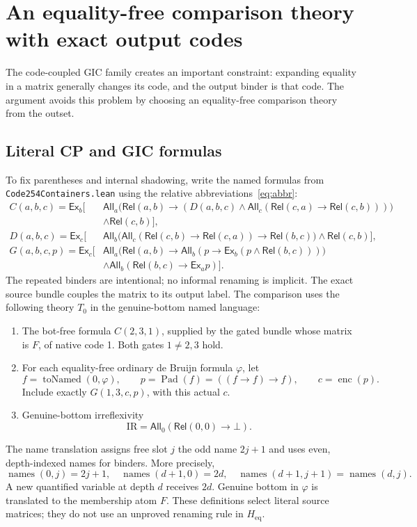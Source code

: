 \documentclass[11pt,letterpaper]{article}
\theoremstyle{definition}\newtheorem{definition}[theorem]{Definition}
\theoremstyle{remark}\newtheorem{remark}[theorem]{Remark}
\newcommand{\Rel}{\mathsf{Rel}}
\newcommand{\All}{\mathsf{All}}
\newcommand{\Ex}{\mathsf{Ex}}
\newcommand{\enc}{\operatorname{enc}}
\newcommand{\pad}{\operatorname{Pad}}
\newcommand{\To}{\rightarrow}
\newcommand{\Hh}{H_{\mathrm{eq}}}
\newcommand{\file}[1]{\begingroup\small\ttfamily\nolinkurl{#1}\endgroup}
\begin{document}
\section{An equality-free comparison theory with exact output codes}\label{sec:theory}
The code-coupled GIC family creates an important constraint: expanding equality in a matrix generally changes its code, and the output binder is that code. The argument avoids this problem by choosing an equality-free comparison theory from the outset.

\subsection{Literal CP and GIC formulas}
To fix parentheses and internal shadowing, write the named formulas from \file{Code254Containers.lean} using the relative abbreviations~\eqref{eq:abbr}:
\begin{align*}
 C(a,b,c)=\Ex_b\bigl[&\All_a\bigl(\Rel(a,b)\To
   (D(a,b,c)\wedge\All_c(\Rel(c,a)\To\Rel(c,b)))\bigr)\\[-1pt]
 &\wedge\Rel(c,b)\bigr],\\
 D(a,b,c)=\Ex_c\bigl[&\All_b\bigl(\All_c(\Rel(c,b)\To\Rel(c,a))\To\Rel(b,c)\bigr)
 \wedge\Rel(c,b)\bigr],\\
 G(a,b,c,p)=\Ex_c\bigl[&\All_a\bigl(\Rel(a,b)\To
     \All_b(p\To\Ex_b(p\wedge\Rel(b,c)))\bigr)\\[-1pt]
 &\wedge\All_b(\Rel(b,c)\To\Ex_a p)\bigr].
\end{align*}
The repeated binders are intentional; no informal renaming is implicit. The exact source bundle couples the matrix to its output label. The comparison uses the following theory $T_0$ in the genuine-bottom named language:
\begin{enumerate}
\item The bot-free formula $C(2,3,1)$, supplied by the gated bundle whose matrix is $F$, of native code 1. Both gates $1\ne2,3$ hold.
\item For each equality-free ordinary de Bruijn formula $\varphi$, let
\begin{equation}\label{eq:matrix}
 f=\operatorname{toNamed}(0,\varphi),\qquad
 p=\pad(f)=((f\To f)\To f),\qquad c=\enc(p).
\end{equation}
Include exactly $G(1,3,c,p)$, with this actual $c$.
\item Genuine-bottom irreflexivity
\[
 \mathrm{IR}=\All_0(\Rel(0,0)\To\bot).
\]
\end{enumerate}
The name translation assigns free slot $j$ the odd name $2j+1$ and uses even, depth-indexed names for binders. More precisely,
\[
 \operatorname{names}(0,j)=2j+1,\quad
 \operatorname{names}(d+1,0)=2d,\quad
 \operatorname{names}(d+1,j+1)=\operatorname{names}(d,j).
\]
A new quantified variable at depth $d$ receives $2d$. Genuine bottom in $\varphi$ is translated to the membership atom $F$. These definitions select literal source matrices; they do not use an unproved renaming rule in $\Hh$.
\end{document}
